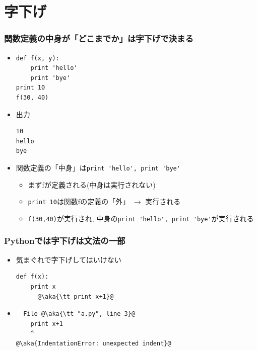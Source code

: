 \documentclass[10pt,dvipdfmx]{beamer}
\newcommand{\aka}[1]{{\color{red}#1}}
\begin{document}
\section{字下げ}

\begin{frame}[fragile]
\frametitle{関数定義の中身が「どこまでか」は字下げで決まる}

\begin{itemize}
\item 
\begin{lstlisting}
def f(x, y):
    print 'hello'
    print 'bye'
print 10
f(30, 40)
\end{lstlisting}

\item<2> 出力
\begin{lstlisting}
10
hello
bye
\end{lstlisting}

\item<2> 関数定義の「中身」は\verb+print 'hello', print 'bye'+
  \begin{itemize}
  \item まずfが定義される(中身は実行されない)
  \item \verb+print 10+は関数fの定義の「外」 $\rightarrow$ 実行される
  \item \verb+f(30,40)+が実行され, 中身の\verb+print 'hello', print 'bye'+が実行される
  \end{itemize}
\end{itemize}
\end{frame}


\begin{frame}[fragile]
\frametitle{Pythonでは字下げは文法の一部}
\begin{itemize}
\item 気まぐれで字下げしてはいけない
\begin{lstlisting}
def f(x):
    print x
      @\aka{\tt print x+1}@
\end{lstlisting}
\item 
\begin{lstlisting}
  File @\aka{\tt "a.py", line 3}@
    print x+1
    ^
@\aka{IndentationError: unexpected indent}@
\end{lstlisting}
\end{itemize}
\end{frame}
\end{document}
